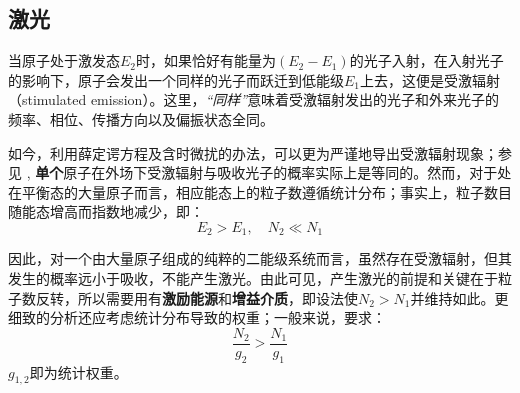 \documentclass{buaaemp}
\begin{document}
\subsection{激光}
	当原子处于激发态$E_2$时，如果恰好有能量为$(E_2-E_1)$的光子入射，在入射光子的影响下，原子会发出一个同样的光子而跃迁到低能级$E_1$上去，这便是受激辐射（stimulated emission）。这里，\textit{“同样”}意味着受激辐射发出的光子和外来光子的频率、相位、传播方向以及偏振状态全同。

\newpage
	如今，利用薛定谔方程及含时微扰的办法，可以更为严谨地导出受激辐射现象；参见 \cite{griffiths2016introduction}, \textbf{单个}原子在外场下受激辐射与吸收光子的概率实际上是等同的。然而，对于处在平衡态的大量原子而言，相应能态上的粒子数遵循统计分布；事实上，粒子数目随能态增高而指数地减少，即：\vspace{-2ex}
	\begin{equation}
		E_2 > E_1,\quad N_2 \ll N_1
	\end{equation}
	
	因此，对一个由大量原子组成的纯粹的二能级系统而言，虽然存在受激辐射，但其发生的概率远小于吸收，不能产生激光。由此可见，产生激光的前提和关键在于粒子数反转，所以需要用有\textbf{激励能源}和\textbf{增益介质}，即设法使$N_2 > N_1$并维持如此。更细致的分析还应考虑统计分布导致的权重；一般来说，要求：
	\begin{equation}
		\frac{N_2}{g_2} > \frac{N_1}{g_1}
	\end{equation}
	$g_{1,2}$即为统计权重。
\end{document}
